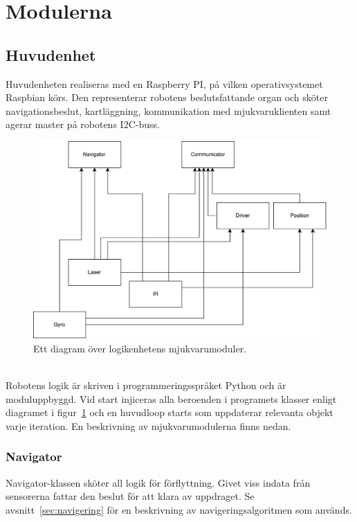 \documentclass{article}
\begin{document}
\clearpage
\section{Modulerna}

\subsection{Huvudenhet}
Huvudenheten realiseras med en Raspberry PI, på vilken operativsystemet Raspbian körs. Den representerar robotens beslutsfattande organ och sköter navigationsbeslut, kartläggning, kommunikation med mjukvaruklienten samt agerar master på robotens I2C-buss.

\begin{figure}[H]
\centering
\includegraphics[scale=0.45]{mjukvarumoduler}
\caption{Ett diagram över logikenhetens mjukvarumoduler.}
\label{fig:mjukvarumoduler}
\end{figure}
\ \\
 Robotens logik är skriven i programmeringsspråket Python och är moduluppbyggd. Vid start injiceras alla beroenden i programets klasser enligt diagramet i figur~\ref{fig:mjukvarumoduler} och en huvudloop starts som uppdaterar relevanta objekt varje iteration. En beskrivning av mjukvarumodulerna finns nedan.

\subsubsection{Navigator}
Navigator-klassen sköter all logik för förflyttning. Givet viss indata från sensorerna fattar den beslut för att klara av uppdraget. Se avsnitt~\ref{sec:navigering} för en beskrivning av navigeringsalgoritmen som används.
\end{document}
